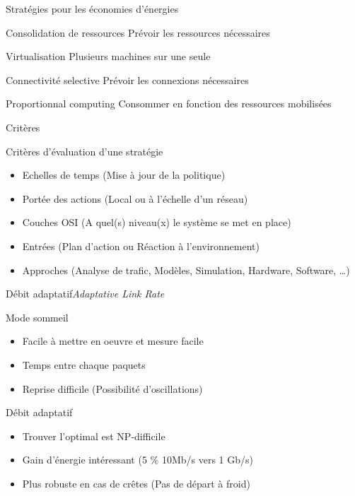 \begin{frame}{Stratégies pour les économies d'énergies}{}

\begin{block}{Consolidation de ressources}
Prévoir les ressources nécessaires
\end{block}
\begin{block}{Virtualisation}
Plusieurs machines sur une seule
\end{block}
\begin{block}{Connectivité selective}
Prévoir les connexions nécessaires
\end{block}
\begin{block}{Proportionnal computing}
Consommer en fonction des ressources mobilisées
\end{block}
\end{frame}

\begin{frame}{Critères}
\begin{block}{Critères d'évaluation d'une stratégie}
\begin{itemize}
\item Echelles de temps (Mise à jour de la politique)
\item Portée des actions (Local ou à l'échelle d'un réseau)
\item Couches OSI (A quel(s) niveau(x) le système se met en place)
\item Entrées (Plan d'action ou Réaction à l'environnement)
\item Approches (Analyse de trafic, Modèles, Simulation, Hardware, Software, \ldots)
\end{itemize}
\end{block}

\end{frame}

\begin{frame}{Débit adaptatif}{\textit{Adaptative Link Rate}}

\begin{block}{Mode sommeil}
\begin{itemize}
\item Facile à mettre en oeuvre et mesure facile
\item Temps entre chaque paquets
\item Reprise difficile (Possibilité d'oscillations)
\end{itemize}
\end{block}


\begin{block}{Débit adaptatif}
\begin{itemize}
\item Trouver l'optimal est NP-difficile
\item Gain d'énergie intéressant (5 \% 10Mb/s vers 1 Gb/s)
\item Plus robuste en cas de crêtes (Pas de départ à froid)
\end{itemize}
\end{block}
\end{frame}



